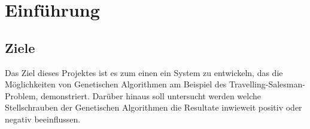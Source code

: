
\section{Einführung}


\subsection{Ziele}

Das Ziel dieses Projektes ist es zum einen ein System zu entwickeln, das die Möglichkeiten von Genetischen Algorithmen am Beispiel des Travelling-Salesman-Problem, demonstriert.
Darüber hinaus soll untersucht werden welche Stellschrauben der Genetischen Algorithmen die Resultate inwieweit positiv oder negativ beeinflussen.

